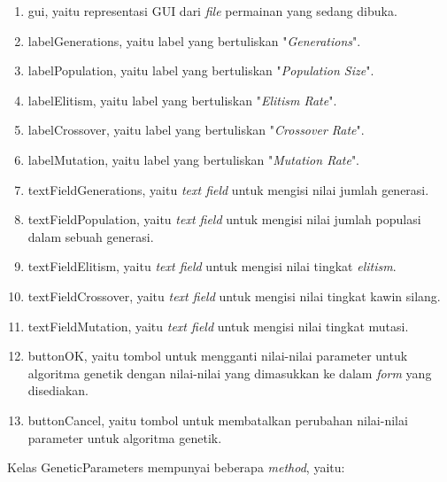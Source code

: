\begin{enumerate}
\item gui, yaitu representasi GUI dari \textit{file} permainan yang sedang dibuka.
\item labelGenerations, yaitu label yang bertuliskan "\textit{Generations}".
\item labelPopulation, yaitu label yang bertuliskan "\textit{Population Size}".
\item labelElitism, yaitu label yang bertuliskan "\textit{Elitism Rate}".
\item labelCrossover, yaitu label yang bertuliskan "\textit{Crossover Rate}".
\item labelMutation, yaitu label yang bertuliskan "\textit{Mutation Rate}".
\item textFieldGenerations, yaitu \textit{text field} untuk mengisi nilai jumlah generasi.
\item textFieldPopulation, yaitu \textit{text field} untuk mengisi nilai jumlah populasi dalam sebuah generasi.
\item textFieldElitism, yaitu \textit{text field} untuk mengisi nilai tingkat \textit{elitism}.
\item textFieldCrossover, yaitu \textit{text field} untuk mengisi nilai tingkat kawin silang.
\item textFieldMutation, yaitu \textit{text field} untuk mengisi nilai tingkat mutasi.
\item buttonOK, yaitu tombol untuk mengganti nilai-nilai parameter untuk algoritma genetik dengan nilai-nilai yang dimasukkan ke dalam \textit{form} yang disediakan.
\item buttonCancel, yaitu tombol untuk membatalkan perubahan nilai-nilai parameter untuk algoritma genetik.
\end{enumerate}

Kelas GeneticParameters mempunyai beberapa \textit{method}, yaitu:

